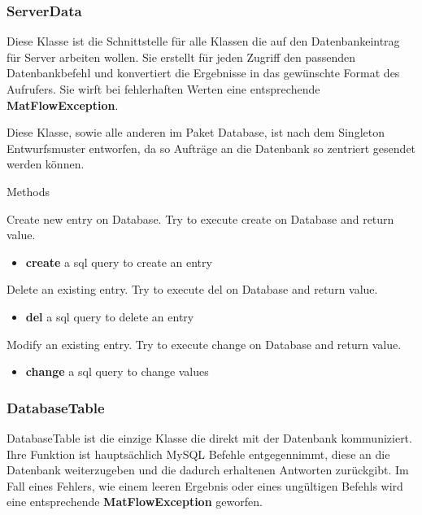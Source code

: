 \subsubsection{ServerData}
Diese Klasse ist die Schnittstelle für alle Klassen die auf den Datenbankeintrag für Server arbeiten wollen. Sie erstellt für jeden Zugriff den passenden Datenbankbefehl und konvertiert die Ergebnisse in das gewünschte Format des Aufrufers.
Sie wirft bei fehlerhaften Werten eine entsprechende \textbf{MatFlowException}.

Diese Klasse, sowie alle anderen im Paket Database, ist nach dem Singleton Entwurfsmuster entworfen, da so Aufträge an die Datenbank so zentriert gesendet werden können.

\begin{methodenv}{Methods}
	
 Create new entry on Database. Try to execute create on Database and return value.

\begin{itemize}
	\item \textbf{create} 
	a sql query to create an entry
\end{itemize}

 Delete an existing entry. Try to execute del on Database and return value.

\begin{itemize}
	\item \textbf{del} 
	a sql query to delete an entry
\end{itemize}

 Modify an existing entry. Try to execute change on Database and return value.

\begin{itemize}
	\item \textbf{change} 
	a sql query to change values
\end{itemize}

\end{methodenv}

\subsubsection{DatabaseTable}
DatabaseTable ist die einzige Klasse die direkt mit der Datenbank kommuniziert. Ihre Funktion ist hauptsächlich MySQL Befehle entgegennimmt, diese an die Datenbank weiterzugeben und die dadurch erhaltenen Antworten zurückgibt. Im Fall eines Fehlers, wie einem leeren Ergebnis oder eines ungültigen Befehls wird eine entsprechende \textbf{MatFlowException} geworfen.

